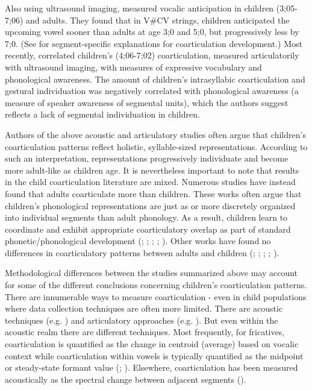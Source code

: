 \documentclass[a4paper,man,floatsintext,natbib,donotrepeattitle, apacite]{apa6}
\begin{document}
Also using ultrasound imaging, \citet{noirayBackFutureNonlinear2019} measured vocalic anticipation in children (3;05-7;06) and adults. They found that in V\#CV strings, children anticipated the upcoming vowel sooner than adults at age 3;0 and 5;0, but progressively less by 7;0. (See \citet{noirayHowChildrenOrganize2018} for segment-specific explanations for coarticulation development.) Most recently, \citet{noiraySpokenLanguageDevelopment2019} correlated children's (4;06-7;02) coarticulation, measured articulatorily with ultrasound imaging, with measures of expressive vocabulary and phonological awareness. The amount of children's intrasyllabic coarticulation and gestural individuation was negatively correlated with phonological awareness (a measure of speaker awareness of segmental units), which the authors suggest reflects a lack of segmental individuation in children. 

Authors of the above acoustic and articulatory studies often argue that children's coarticulation patterns reflect holistic, syllable-sized representations. According to such an interpretation, representations progressively individuate and become more adult-like as children age. It is nevertheless important to note that results in the child coarticulation literature are mixed. Numerous studies have instead found that adults coarticulate more than children. These works often argue that children's phonological representations are just as or more discretely organized into individual segments than adult phonology. As a result, children learn to coordinate and exhibit appropriate coarticulatory overlap as part of standard phonetic/phonological development (\citealt{barbierSpeechPlanningIndex2013}; \citealt{barbierSpeechPlanning4yearold2015}; \citealt{katzAnticipatoryCoarticulationSpeech1991}; \citealt{kentSegmentalOrganizationSpeech1983}; \citealt{whitesideSpeechPatternsChildren2000}). Other works have found no differences in coarticulatory patterns between adults and children (\citealt{flegeAnticipatoryCarryoverNasal1988}; \citealt{goffmanBreadthCoarticulatoryUnits2008}; \citealt{noirayDevelopmentMotorSynergies2013}; \citealt{serenoDevelopmentalAspectsLingual1987}; \citealt{serenoAcousticAnalysesPerceptual1987}).

Methodological differences between the studies summarized above may account for some of the different conclusions concerning children's coarticulation patterns. There are innumerable ways to measure coarticulation - even in child populations where data collection techniques are often more limited. There are acoustic techniques (e.g. \citealt{nittrouerHowChildrenLearn1996}) and articulatory approaches (e.g. \citealt{zharkovaSpatialTemporalLingual2014}). But even within the acoustic realm there are different techniques. Most frequently, for fricatives, coarticulation is quantified as the change in centroid (average) based on vocalic context while coarticulation within vowels is typically quantified as the midpoint or steady-state formant value (\citealt{nittrouerEmergencePhoneticSegments1989}; \citealt{nittrouerHowChildrenLearn1996}). Elsewhere, coarticulation has been measured acoustically as the spectral change between adjacent segments (\citealt{gerosaAnalyzingChildrenSpeech2006}).
\end{document}
